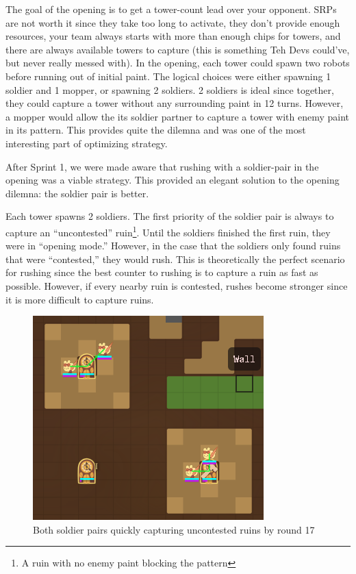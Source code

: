 The goal of the opening is to get a tower-count lead over your opponent. SRPs are not worth it since they take too long to activate, they don't provide enough resources, your team always starts with more than enough chips for towers, and there are always available towers to capture (this is something Teh Devs could've, but never really messed with). In the opening, each tower could spawn two robots before running out of initial paint. The logical choices were either spawning 1 soldier and 1 mopper, or spawning 2 soldiers. 2 soldiers is ideal since together, they could capture a tower without any surrounding paint in 12 turns. However, a mopper would allow the its soldier partner to capture a tower with enemy paint in its pattern. This provides quite the dilemna and was one of the most interesting part of optimizing strategy. 

\medskip

After Sprint 1, we were made aware that rushing with a soldier-pair in the opening was a viable strategy. This provided an elegant solution to the opening dilemna: the soldier pair is better.

\medskip

Each tower spawns 2 soldiers. The first priority of the soldier pair is always to capture an ``uncontested'' ruin\footnote{A ruin with no enemy paint blocking the pattern}. Until the soldiers finished the first ruin, they were in ``opening mode.'' However, in the case that the soldiers only found ruins that were ``contested,'' they would rush. This is theoretically the perfect scenario for rushing since the best counter to rushing is to capture a ruin as fast as possible. However, if every nearby ruin is contested, rushes become stronger since it is more difficult to capture ruins.
\begin{figure}[H]
  \centering
  \includegraphics[scale=0.75]{images/round_17_capture.png}
  \caption{Both soldier pairs quickly capturing uncontested ruins by round 17}
\end{figure}

